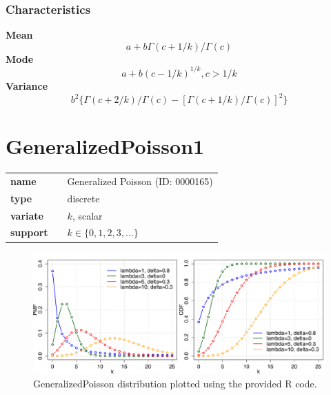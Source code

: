 \subsubsection*{Characteristics}
\smallskip \noindent \hspace{.2cm} \textbf{Mean} 
\begin{equation*}a + b\Gamma(c+1/k)/\Gamma(c)\end{equation*}
\smallskip \noindent \hspace{.2cm} \textbf{Mode} 
\begin{equation*}a+b(c-1/k)^{1/k}, c>1/k\end{equation*}
\smallskip \noindent \hspace{.2cm} \textbf{Variance} 
\begin{equation*}b^2\{\Gamma(c+2/k)/\Gamma(c)-[\Gamma(c+1/k)/\Gamma(c)]^2\}\end{equation*}
\smallskip
\section*{GeneralizedPoisson1} 

  \bigskip 

\begin{tabular}{p{2cm}cl}
\textbf{name} & & Generalized Poisson (ID: 0000165)\\ 
 
\textbf{type} & & discrete \\ 

\textbf{variate} & & $k
$, scalar \\ 

\textbf{support} & & $k \in \{0,1,2,3,\dots\}$
\end{tabular}

\begin{figure}[ht!]
\centering
  \includegraphics[width=140mm]{pics/GeneralizedPoisson.pdf}
 \caption{GeneralizedPoisson distribution plotted using the provided R code.}
 \label{fig:GeneralizedPoisson}
\end{figure}

